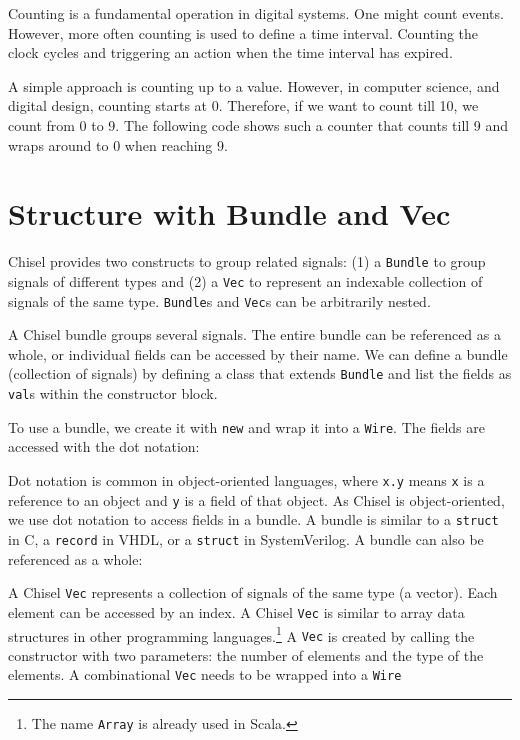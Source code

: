 \documentclass[%
    10pt,
    headinclude, footexclude,
    openright, %
    notitlepage,
    cleardoubleempty,
    headsepline,
    pointlessnumbers,
    bibtotoc, idxtotoc,
    ]{scrbook}
\newcommand{\code}[1]{{\small{\texttt{#1}}}}
\newcommand{\codefoot}[1]{{\footnotesize{\texttt{#1}}}}
\begin{document}
Counting is a fundamental operation in digital systems. One might count events.
However, more often counting is used to define a time interval. Counting the
clock cycles and triggering an action when the time interval has expired.

A simple approach is counting up to a value. However, in computer science,
and digital design, counting starts at 0. Therefore, if we want to count till
10, we count from 0 to 9. The following code shows such a counter that counts
till 9 and wraps around to 0 when reaching 9.


\section{Structure with Bundle and Vec}


Chisel provides two constructs to group related signals: (1) a \code{Bundle} to group
signals of different types and (2) a \code{Vec} to represent an indexable collection of signals
of the same type.
\code{Bundle}s and \code{Vec}s can be arbitrarily nested.

A Chisel bundle groups several signals. The entire bundle can be referenced
as a whole, or individual fields can be accessed by their name.
We can define a bundle (collection of signals) by defining a class that
extends \code{Bundle} and list the fields as \code{val}s within the constructor block.


\noindent To use a bundle, we create it with \code{new} and wrap it into a \code{Wire}.
The fields are accessed with the dot notation:


Dot notation is common in object-oriented languages, where \code{x.y} means
\code{x} is a reference to an object and \code{y} is a field of that object.
As Chisel is object-oriented, we use dot notation to access fields in a bundle.
A bundle is similar to a \code{struct} in C, a \code{record} in VHDL, or a
\code{struct} in SystemVerilog.
A bundle can also be referenced as a whole:


A Chisel \code{Vec} represents a collection of signals of the same type (a vector).
Each element can be accessed by an index. A Chisel \code{Vec} is similar
to array data structures in other programming languages.\footnote{The name \codefoot{Array}
is already used in Scala.}
A \code{Vec} is created by calling the constructor with two parameters: the
number of elements and the type of the elements. A combinational \code{Vec}
needs to be wrapped into a \code{Wire}
\end{document}
